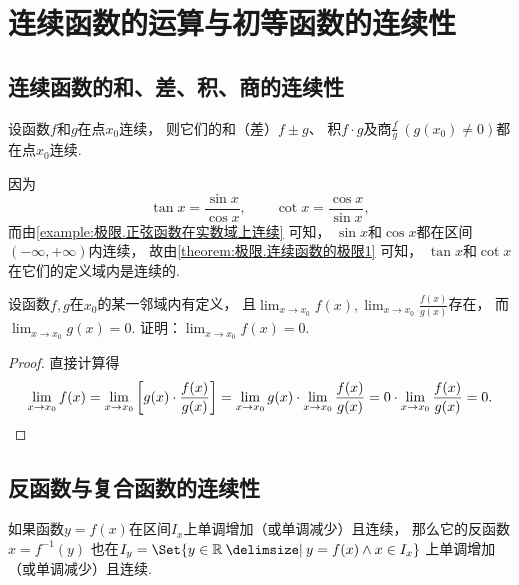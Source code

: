 \section{连续函数的运算与初等函数的连续性}
\subsection{连续函数的和、差、积、商的连续性}
\begin{theorem}\label{theorem:极限.连续函数的极限1}
设函数\(f\)和\(g\)在点\(x_0\)连续，
则它们的和（差）\(f \pm g\)、
积\(f \cdot g\)及商\(\frac{f}{g}\ (g(x_0)\neq0)\)都在点\(x_0\)连续.
\end{theorem}

\begin{example}
因为\[
	\tan x=\frac{\sin x}{\cos x}, \qquad
	\cot x=\frac{\cos x}{\sin x},
\]
而由\cref{example:极限.正弦函数在实数域上连续} 可知，
\(\sin x\)和\(\cos x\)都在区间\((-\infty,+\infty)\)内连续，
故由\cref{theorem:极限.连续函数的极限1} 可知，
\(\tan x\)和\(\cot x\)在它们的定义域内是连续的.
\end{example}

\begin{example}
设函数\(f,g\)在\(x_0\)的某一邻域内有定义，
且\(\lim_{x\to x_0}f(x),
\lim_{x\to x_0}\frac{f(x)}{g(x)}\)存在，
而\(\lim_{x\to x_0}g(x)=0\).
证明：\(\lim_{x\to x_0}f(x)=0\).
\begin{proof}
直接计算得\[
	\lim_{x\to x_0}f(x)
	= \lim_{x\to x_0}\left[
		g(x) \cdot \frac{f(x)}{g(x)}
	\right]
	= \lim_{x\to x_0}g(x) \cdot \lim_{x\to x_0}\frac{f(x)}{g(x)}
	= 0 \cdot \lim_{x\to x_0}\frac{f(x)}{g(x)} = 0.
	\qedhere
\]
\end{proof}
\end{example}

\subsection{反函数与复合函数的连续性}
\begin{theorem}\label{theorem:极限.连续函数的极限2}
如果函数\(y = f(x)\)在区间\(I_x\)上单调增加（或单调减少）且连续，
那么它的反函数\(x = f^{-1}(y)\)
也在\(I_y = \Set{ y\in\mathbb{R} \given y = f(x) \land x \in I_x }\)
上单调增加（或单调减少）且连续.
\end{theorem}

